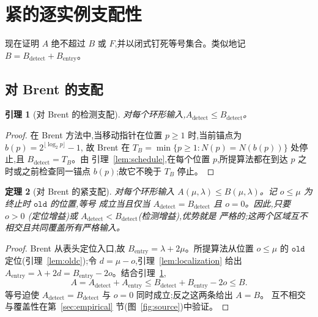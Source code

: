 \documentclass[11pt]{ctexart}
\newtheorem{theorem}{定理}[section]
\newtheorem{lemma}[theorem]{引理}
\newcommand{\oldc}{\texttt{old}}
\begin{document}
\section{紧的逐实例支配性}
\label{sec:dominance}

现在证明 $A$ 绝不超过 $B$ 或 $F$,并以闭式钉死等号集合。类似地记
$B=B_{\mathrm{detect}}+B_{\mathrm{entry}}$。

\subsection{对 Brent 的支配}

\begin{lemma}[对 Brent 的检测支配]
\label{lem:brent-detect}
对每个环形输入,$A_{\mathrm{detect}}\le B_{\mathrm{detect}}$。
\end{lemma}

\begin{proof}
在 Brent 方法中,当移动指针在位置 $p\ge1$ 时,当前锚点为 $b(p)=2^{\lfloor\log_2 p\rfloor}-1$,
故 Brent 在 $T_B=\min\{p\ge1:N(p)=N(b(p))\}$ 处停止,且 $B_{\mathrm{detect}}=T_B$。由
引理~\ref{lem:schedule},在每个位置 $p$,所提算法都在到达 $p$ 之时或之前检查同一锚点
$b(p)$;故它不晚于 $T_B$ 停止。
\end{proof}

\begin{theorem}[对 Brent 的紧支配]
\label{thm:brent}
对每个环形输入 $A(\mu,\lambda)\le B(\mu,\lambda)$。记 $o\le\mu$ 为终止时 $\oldc$ 的位置,等号
成立当且仅当 $A_{\mathrm{detect}}=B_{\mathrm{detect}}$ 且 $o=0$。因此,只要 $o>0$
(\emph{定位}增益)或 $A_{\mathrm{detect}}<B_{\mathrm{detect}}$(\emph{检测}增益),优势就是
严格的;这两个区域互不相交且共同覆盖所有严格输入。
\end{theorem}

\begin{proof}
Brent 从表头定位入口,故 $B_{\mathrm{entry}}=\lambda+2\mu$。所提算法从位置 $o\le\mu$ 的
$\oldc$ 定位(引理~\ref{lem:oldc});令 $d=\mu-o$,引理~\ref{lem:localization} 给出
$A_{\mathrm{entry}}=\lambda+2d=B_{\mathrm{entry}}-2o$。结合引理~\ref{lem:brent-detect},
\[
A=A_{\mathrm{detect}}+A_{\mathrm{entry}}\le B_{\mathrm{detect}}+B_{\mathrm{entry}}-2o\le B.
\]
等号迫使 $A_{\mathrm{detect}}=B_{\mathrm{detect}}$ 与 $o=0$ 同时成立;反之这两条给出 $A=B$。
互不相交与覆盖性在第~\ref{sec:empirical} 节(图~\ref{fig:source})中验证。
\end{proof}
\end{document}
